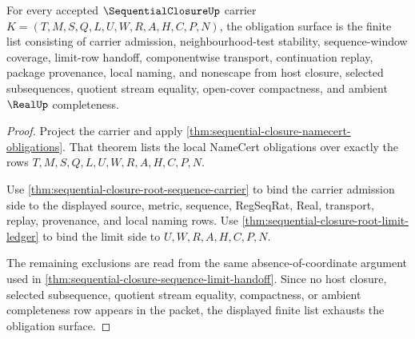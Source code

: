 \begin{theorem}
\label{thm:sequentialclosure-obligation-closure-surface}
For every accepted $\SequentialClosureUp$ carrier $K=(T,M,S,Q,L,U,W,R,A,H,C,P,N)$, the obligation surface is the finite list consisting of carrier admission, neighbourhood-test stability, sequence-window coverage, limit-row handoff, componentwise transport, continuation replay, package provenance, local naming, and nonescape from host closure, selected subsequences, quotient stream equality, open-cover compactness, and ambient $\RealUp$ completeness.
\end{theorem}
\begin{proof}
Project the carrier and apply \autoref{thm:sequential-closure-namecert-obligations}. That theorem lists the local NameCert obligations over exactly the rows $T,M,S,Q,L,U,W,R,A,H,C,P,N$.

Use \autoref{thm:sequential-closure-root-sequence-carrier} to bind the carrier admission side to the displayed source, metric, sequence, RegSeqRat, Real, transport, replay, provenance, and local naming rows. Use \autoref{thm:sequential-closure-root-limit-ledger} to bind the limit side to $U,W,R,A,H,C,P,N$.

The remaining exclusions are read from the same absence-of-coordinate argument used in \autoref{thm:sequential-closure-sequence-limit-handoff}. Since no host closure, selected subsequence, quotient stream equality, compactness, or ambient completeness row appears in the packet, the displayed finite list exhausts the obligation surface.
\end{proof}

